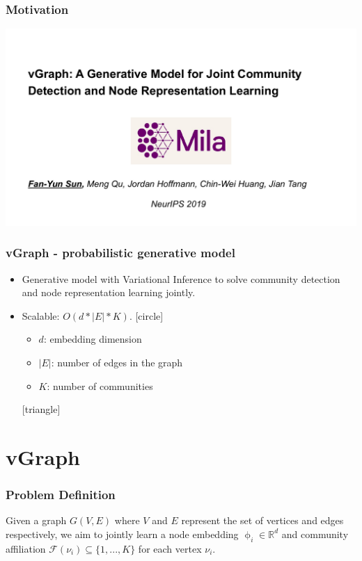 \documentclass[12pt,aspectratio=169]{beamer}
\begin{document}
    \begin{frame}
        \frametitle{Motivation}

        \centering
        \includegraphics[page=5,trim=2cm 0 2cm 3cm,clip,scale=0.6]{vGraph_slides.pdf}
    \end{frame}

    \begin{frame}
        \frametitle{vGraph - probabilistic generative model}

        \begin{itemize}
            \setlength{\itemsep}{.8em}
            \item Generative model with Variational Inference to solve community detection and node representation learning jointly.
            \item Scalable: $O(d * |E| * K)$.
            [circle]
                \begin{itemize}
                    \item $d$: embedding dimension
                    \item $|E|$: number of edges in the graph
                    \item $K$: number of communities
                \end{itemize}
            [triangle]
        \end{itemize}
    \end{frame}

    \section{vGraph}

    \begin{frame}
        \frametitle{Problem Definition}

        Given a graph $G(V, E)$ where $V$ and $E$ represent the set of vertices and edges respectively, we aim to jointly
        learn a node embedding $\upphi_i \in \mathbb{R}^d$ and community affiliation $\mathcal{F}(\nu_i) \subseteq \{1, ..., K\}$
        for each vertex $\nu_i$.
    \end{frame}
\end{document}
